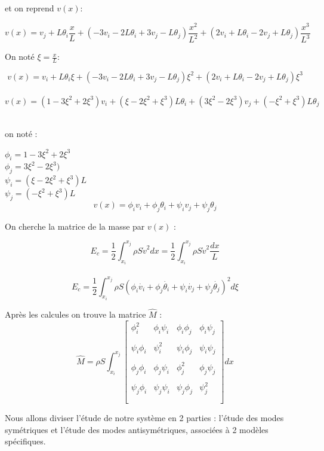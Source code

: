 \documentclass[a4paper,10pt]{report} %
\begin{document}
et on reprend $v(x)$:

\begin{equation}
v(x)=v_j+L\theta_i\frac{x}{L}+(-3v_i-2L\theta_i+3v_j-L\theta_j)\frac{x^2}{L^2}+(2v_i+L\theta_i-2v_j+L\theta_j)\frac{x^3}{L^3}
\end{equation}

On noté $\xi=\frac{x}{L}$:
\begin{center}
$$v(x)=v_i+L\theta_i\xi+(-3v_i-2L\theta_i+3v_j-L\theta_j)\xi^2+(2v_i+L\theta_i-2v_j+L\theta_j)\xi^3 $$\\
$$v(x)=(1-3\xi^2+2\xi^3)v_i+(\xi-2\xi^2+\xi^3)L\theta_i+(3\xi^2-2\xi^3)v_j+(-\xi^2+\xi^3)L\theta_j$$\\
\end{center}


on noté :
\begin{center}
$\phi_i=1-3\xi^2+2\xi^3$\\$\phi_j=3\xi^2-2\xi^3)$\\$\psi_i=(\xi-2\xi^2+\xi^3)L$\\$\psi_j=(-\xi^2+\xi^3)L$\\
$$v(x)=\phi_iv_i+\phi_j\theta_i+\psi_iv_j+\psi_j\theta_j$$
\end{center}

On cherche la matrice de la masse  par $v(x)$ :
\begin{center}
$$E_c=\frac{1}{2}\int_{x_i}^{x_j}\rho S\dot{v}^2dx=\frac{1}{2}\int_{x_i}^{x_j}\rho S\dot{v}^2\frac{dx}{L}$$\\
$$E_c=\frac{1}{2}\int_{x_i}^{x_j}\rho S(\phi_i\dot{v_i}+\phi_j\dot{\theta_i}+\psi_i\dot{v_j}+\psi_j\dot{\theta_j})^2d\xi$$
\end{center}

Après les calcules on trouve la matrice $\widehat{M}$ :
\[ \widehat{M}=\rho S\int_{x_i}^{x_j}\left[ \begin{array}{cccc}
\phi_i^2 &\phi_i\psi_i& \phi_i\phi_j&\phi_i\psi_j     \\\\
\psi_i\phi_i & \psi_i^2& \psi_i\phi_j&\psi_i\psi_j \\\\
\phi_j\phi_i &\phi_j\psi_i& \phi_j^2&\phi_j\psi_j     \\\\
\psi_j\phi_i &\psi_j\psi_i&\psi_j \phi_j&\psi_j^2    \\\\
 \end{array} \right]dx\]


Nous allons diviser l'étude de notre système en 2 parties : l'étude des modes symétriques et l'étude des modes antisymétriques, associées à 2 modèles spécifiques.
\end{document}
